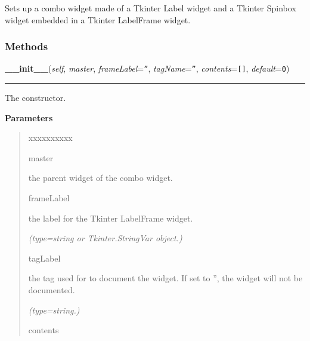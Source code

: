 Sets up a combo widget made of a Tkinter Label widget and a Tkinter Spinbox
widget embedded in a Tkinter LabelFrame widget.



  \subsubsection{Methods}

    \vspace{0.5ex}

\hspace{.8\funcindent}\begin{boxedminipage}{\funcwidth}

    \raggedright \textbf{\_\_init\_\_}(\textit{self}, \textit{master}, \textit{frameLabel}={\tt ''}, \textit{tagName}={\tt ''}, \textit{contents}={\tt []}, \textit{default}={\tt 0})

    \vspace{-1.5ex}

    \rule{\textwidth}{0.5\fboxrule}
\setlength{\parskip}{2ex}
    The constructor.

\setlength{\parskip}{1ex}
      \textbf{Parameters}
      \vspace{-1ex}

      \begin{quote}
        \begin{Ventry}{xxxxxxxxxx}

          \item[master]

          the parent widget of the combo widget.

          \item[frameLabel]

          the label for the Tkinter LabelFrame widget.

            {\it (type=string or Tkinter.StringVar object.)}

          \item[tagLabel]

          the tag used for to document the widget. If set to '', the widget
          will not be documented.

            {\it (type=string.)}

          \item[contents]


\end{Ventry}
\end{quote}
\end{boxedminipage}
